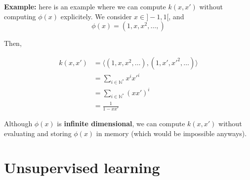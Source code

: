 \documentclass[
10pt, %
a4paper, %
oneside, %
headinclude,footinclude, %
BCOR5mm, %
]{scrartcl}
\begin{document}
\textbf{{Example:}} here is an example  where we can compute $k(x,x')$ without computing $\phi(x)$ explicitely. We consider $x\in ]-1, 1[$, and 
\begin{equation*}
    \phi(x) = (1, x, x^2, \dots, )
\end{equation*}

Then, 

\begin{equation*}
    \begin{aligned}
	k(x,x')&= \langle (1, x, x^2, \dots) , (1, x', x'^2, \dots) \rangle\\
	&=\sum_{i\in \mathbb{N}^*} x^ix'^i \\
	&=\sum_{i\in \mathbb{N}^*} (xx')^i \\
	&= \frac{1}{1-xx'} 
    \end{aligned}
\end{equation*}

Although $\phi(x)$ is \textbf{{infinite dimensional}}, we can compute $k(x,x')$ without evaluating and storing $\phi(x)$ in memory (which would be impossible anyways).

% 
% 
% 

\section{\large\color{Blue}Unsupervised learning}
\end{document}
